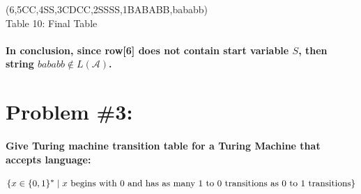 \documentclass[12pt]{article}
\begin{document}

\begin{center}
    \young(6\emptyset,5CC,4SS\emptyset,3CDCC,2SSSS\emptyset,1BABABB,\hfill bababb) \\
    Table 10: Final Table
\end{center}
\paragraph{In conclusion, since row[6] does not contain start variable $S$, then string $bababb \notin L(\mathcal{A})$.}

\section*{Problem \#3:}
\paragraph{Give Turing machine transition table for a Turing Machine that accepts language: }
\begin{equation*}
    \{ x \in \{0,1\}^*\;|\;x \textnormal{ begins with 0 and has as many 1 to 0 transitions as 0 to 1 transitions}\}
\end{equation*}
\end{document}

